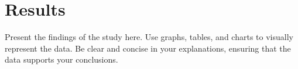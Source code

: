 \section{Results}
Present the findings of the study here. Use graphs, tables, and charts to visually represent the data. Be clear and concise in your explanations, ensuring that the data supports your conclusions.